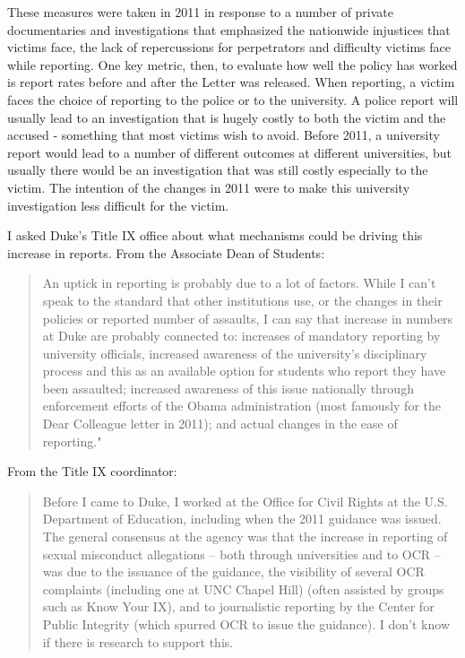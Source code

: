 \documentclass[AER,draftmode]{AEA}
\begin{document}
These measures were taken in 2011 in response to a number of private documentaries and investigations that emphasized the nationwide injustices that victims face, the lack of repercussions for perpetrators and difficulty victims face while reporting. One key metric, then, to evaluate how well the policy has worked is report rates before and after the Letter was released. When reporting, a victim faces the choice of reporting to the police or to the university. A police report will usually lead to an investigation that is hugely costly to both the victim and the accused - something that most victims wish to avoid. Before 2011, a university report would lead to a number of different outcomes at different universities, but usually there would be an investigation that was still costly especially to the victim. The intention of the changes in 2011 were to make this university investigation less difficult for the victim.

I asked Duke's Title IX office about what mechanisms could be driving this increase in reports. From the Associate Dean of Students:

\begin{quote}
An uptick in reporting is probably due to a lot of factors. While I can’t speak to the standard that other institutions use, or the changes in their policies or reported number of assaults, I can say that increase in numbers at Duke are probably connected to: increases of mandatory reporting by university officials, increased awareness of the university’s disciplinary process and this as an available option for students who report they have been assaulted; increased awareness of this issue nationally through enforcement efforts of the Obama administration (most famously for the Dear Colleague letter in 2011); and actual changes in the ease of reporting."
\end{quote}

From the Title IX coordinator:

\begin{quote}
Before I came to Duke, I worked at the Office for Civil Rights at the U.S. Department of Education, including when the 2011 guidance was issued. The general consensus at the agency was that the increase in reporting of sexual misconduct allegations – both through universities and to OCR – was due to the issuance of the guidance, the visibility of several OCR complaints (including one at UNC Chapel Hill) (often assisted by groups such as Know Your IX), and to journalistic reporting by the Center for Public Integrity (which spurred OCR to issue the guidance). I don’t know if there is research to support this.
\end{quote}
\end{document}
